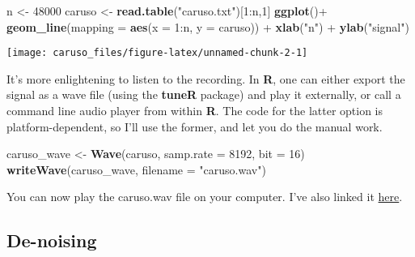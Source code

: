 \documentclass[]{tufte-handout}
\newenvironment{Shaded}{}{}
\newcommand{\KeywordTok}[1]{\textcolor[rgb]{0.00,0.44,0.13}{\textbf{#1}}}
\newcommand{\DataTypeTok}[1]{\textcolor[rgb]{0.56,0.13,0.00}{#1}}
\newcommand{\DecValTok}[1]{\textcolor[rgb]{0.25,0.63,0.44}{#1}}
\newcommand{\StringTok}[1]{\textcolor[rgb]{0.25,0.44,0.63}{#1}}
\newcommand{\OperatorTok}[1]{\textcolor[rgb]{0.40,0.40,0.40}{#1}}
\newcommand{\NormalTok}[1]{#1}
\begin{document}
\begin{Shaded}
\begin{Highlighting}[]
\NormalTok{n <-}\StringTok{ }\DecValTok{48000}
\NormalTok{caruso <-}\StringTok{ }\KeywordTok{read.table}\NormalTok{(}\StringTok{"caruso.txt"}\NormalTok{)[}\DecValTok{1}\OperatorTok{:}\NormalTok{n,}\DecValTok{1}\NormalTok{]}
\KeywordTok{ggplot}\NormalTok{()}\OperatorTok{+}
\StringTok{  }\KeywordTok{geom_line}\NormalTok{(}\DataTypeTok{mapping =} \KeywordTok{aes}\NormalTok{(}\DataTypeTok{x =} \DecValTok{1}\OperatorTok{:}\NormalTok{n, }\DataTypeTok{y =}\NormalTok{ caruso)) }\OperatorTok{+}
\StringTok{  }\KeywordTok{xlab}\NormalTok{(}\StringTok{"n"}\NormalTok{) }\OperatorTok{+}
\StringTok{  }\KeywordTok{ylab}\NormalTok{(}\StringTok{"signal"}\NormalTok{)}
\end{Highlighting}
\end{Shaded}

\begin{marginfigure}
\texttt{[image: caruso\_files/figure-latex/unnamed-chunk-2-1]} \end{marginfigure}

It's more enlightening to listen to the recording. In \textbf{R}, one
can either export the signal as a wave file (using the \textbf{tuneR}
package) and play it externally, or call a command line audio player
from within \textbf{R}. The code for the latter option is
platform-dependent, so I'll use the former, and let you do the manual
work.

\begin{Shaded}
\begin{Highlighting}[]
\NormalTok{caruso_wave <-}\StringTok{ }\KeywordTok{Wave}\NormalTok{(caruso, }\DataTypeTok{samp.rate =} \DecValTok{8192}\NormalTok{, }\DataTypeTok{bit =} \DecValTok{16}\NormalTok{)}
\KeywordTok{writeWave}\NormalTok{(caruso_wave, }\DataTypeTok{filename =} \StringTok{"caruso.wav"}\NormalTok{)}
\end{Highlighting}
\end{Shaded}

You can now play the caruso.wav file on your computer. I've also linked
it \href{caruso.wav}{here}.

\subsection{De-noising}\label{de-noising}
\end{document}
